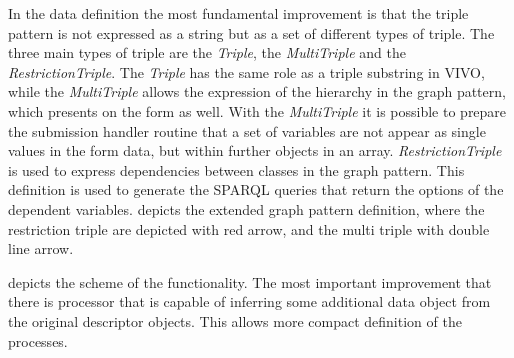 In the data definition the most fundamental improvement is that the triple pattern is not expressed as a string but as a set of different types of triple. The three main types of triple are the \textit{Triple}, the \textit{MultiTriple} and the \textit{RestrictionTriple}. The \textit{Triple} has the same role as a triple substring in VIVO, while the \textit{MultiTriple} allows the expression of the hierarchy in the graph pattern, which presents on the form as well. With the \textit{MultiTriple} it is possible to prepare the submission handler routine that a set of variables are not appear as single values in the form data, but within further objects in an array. \textit{RestrictionTriple} is used to express dependencies between classes in the graph pattern. This definition is used to generate the SPARQL queries that return the options of the dependent variables.  depicts the extended graph pattern definition, where the restriction triple are depicted with red arrow, and the multi triple with double line arrow.


 depicts the scheme of the functionality. The most important improvement that there is processor that is capable of inferring some additional data object from the original descriptor objects. This allows more compact definition of the processes.

